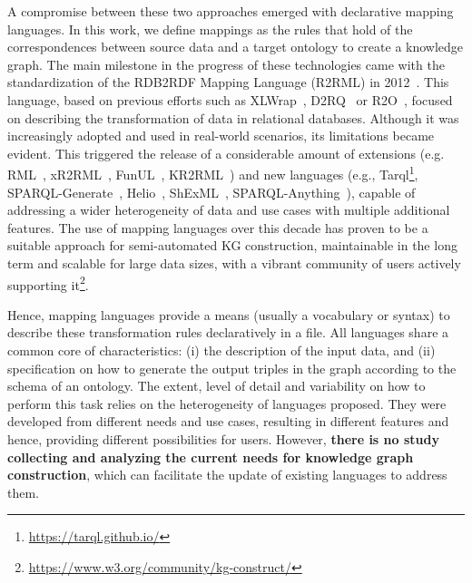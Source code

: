 A compromise between these two approaches emerged with declarative mapping languages. 
In this work, we define mappings as the rules that hold of the correspondences between source data and a target ontology to create a knowledge graph. 
The main milestone in the progress of these technologies came with the standardization of the RDB2RDF Mapping Language (R2RML) in 2012~\parencite{das2012r2rml}. 
This language, based on previous efforts such as XLWrap~\parencite{xlwrap}, D2RQ~\parencite{bizer2004d2rq} or R2O~\parencite{barrasa2004r2o}, focused on describing the transformation of data in relational databases. 
Although it was increasingly adopted and used in real-world scenarios, its limitations became evident. 
This triggered the release of a considerable amount of extensions (e.g. RML~\parencite{Dimou2014rml}, xR2RML~\parencite{michel2015xr2rml}, FunUL~\parencite{junior2016funul}, KR2RML~\parencite{slepicka2015kr2rml})
and new languages (e.g., Tarql\footnote{\url{https://tarql.github.io/}}, 
SPARQL-Generate~\parencite{Lefrancois2017sparqlgenerate}, 
Helio~\parencite{cimmino2022helio}, 
ShExML~\parencite{Garcia-Gonzalez2020shexml}, 
SPARQL-Anything~\parencite{asprino2023sparql-anything}), 
capable of addressing a wider heterogeneity of data and use cases with multiple additional features. 
The use of mapping languages over this decade has proven to be a suitable approach for semi-automated KG construction, maintainable in the long term and scalable for large data sizes, with a vibrant community of users actively supporting it\footnote{\url{https://www.w3.org/community/kg-construct/}}. 


 Hence, mapping languages provide a means (usually a vocabulary or syntax) to describe these transformation rules declaratively in a file. All languages share a common core of characteristics: (i) the description of the input data, and (ii) specification on how to generate the output triples in the graph according to the schema of an ontology. The extent, level of detail and variability on how to perform this task relies on the heterogeneity of languages proposed. They were developed from different needs and use cases, resulting in different features and hence, providing different possibilities for users. However, \textbf{there is no study collecting and analyzing the current needs for knowledge graph construction}, which can facilitate the update of existing languages to address them. 


